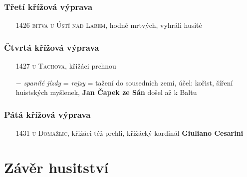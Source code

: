 \documentclass{article}
\begin{document}
\subsubsection*{Třetí křížová výprava}
\begin{itemize}
    \vspace{-0.5em}
    \setlength\itemsep{0.15em}
    \item[1426] \textsc{bitva u Ústí nad Labem}, hodně mrtvých, vyhráli husité
\end{itemize}


\subsubsection*{Čtvrtá křížová výprava}
\begin{itemize}
    \vspace{-0.5em}
    \setlength\itemsep{0.15em}
    \item[1427] \textsc{ u Tachova}, křižáci prchnou
\end{itemize}

\begin{itemize}
    \vspace{-0.5em}
    \setlength\itemsep{0.15em}
    \item[$-$] \textit{spanilé jízdy} = \textit{rejzy} = tažení do sousedních zemí, účel: kořist, šíření huistských myšlenek, \textbf{Jan Čapek ze Sán} došel až k Baltu
\end{itemize}

\subsubsection*{Pátá křížová výprava}
\begin{itemize}
    \vspace{-0.5em}
    \setlength\itemsep{0.15em}
    \item[1431] \textsc{ u Domažlic}, křižáci též prchli, křižácký kardinál \textbf{Giuliano Cesarini}
\end{itemize}

\section*{Závěr husitství}
\end{document}
